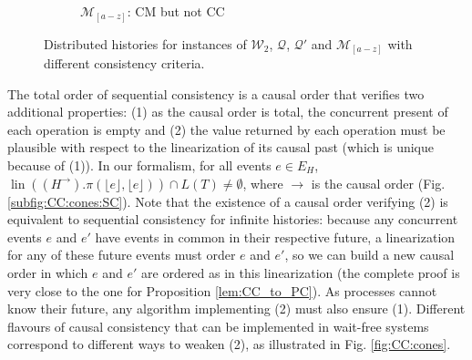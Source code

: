 \documentclass[9pt,numbers]{sigplanconf}
\DeclareMathOperator{\lin}{lin}
\begin{document}
\begin{figure*}[t]
\begin{subfigure}[b]{0.35\textwidth}
    \caption{\footnotesize $\mathscr{M}_{[a-z]}$: CM but not CC}
    \label{fig:Mem_CM_pas_CC}
  \end{subfigure}
  \hspace{\fill}
  \caption{Distributed histories for instances of $\mathscr{W}_2$, $\mathscr{Q}$, $\mathscr{Q}'$ and $\mathscr{M}_{[a-z]}$ with different consistency criteria.
  }
  \label{fig:exemples_histoires}
\end{figure*}

The total order of sequential consistency is a causal order that verifies two additional properties: (1) as the 
causal order is total, the concurrent present of each operation is empty and (2) the value
returned by each operation must be plausible with respect to the linearization of its causal
past (which is unique because of (1)). In our formalism, for all events $e\in E_H$, 
$\lin((H^\rightarrow).\pi(\lfloor e\rfloor, \lfloor e\rfloor))\cap L(T) \neq \emptyset$, where $\rightarrow$ 
is the causal order (Fig. \ref{subfig:CC:cones:SC}). 
Note that the existence of a causal order verifying (2) is equivalent to 
sequential consistency for infinite histories: because any concurrent 
events $e$ and $e'$ have events in common in their respective future, 
a linearization for any of these future events must order $e$ and $e'$, 
so we can build a new causal order in which $e$ and $e'$ are ordered as 
in this linearization (the complete proof is very close to the one for Proposition \ref{lem:CC_to_PC}). 
As processes cannot
know their future, any algorithm implementing (2) must also ensure (1). 
Different flavours of causal consistency that can be implemented in wait-free systems
correspond to different ways to weaken (2), as illustrated in Fig. \ref{fig:CC:cones}.
\end{document}
